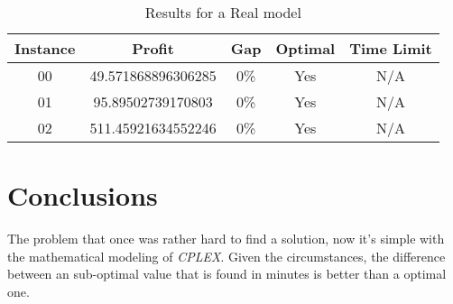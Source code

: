 \documentclass[a4paper,10pt]{article}
\begin{document}
\newpage


\begin{table}[h]
\caption{Results for a Real model}
\centering
\label{tab:my-table1}
\begin{tabular}{ccccc}
\hline
Instance & Profit             & Gap & Optimal & Time Limit \\ \hline
00       & 49.571868896306285 & 0\% & Yes     & N/A       \\
01       & 95.89502739170803  & 0\% & Yes     & N/A       \\
02       & 511.45921634552246 & 0\% & Yes     & N/A       \\ \hline
\end{tabular}
\end{table}

\section{Conclusions}
The problem that once was rather hard to find a solution, now it's simple with the mathematical modeling of \emph{CPLEX}. Given the circumstances, the difference between an sub-optimal value that is found in minutes is better than a optimal one.
\end{document}
